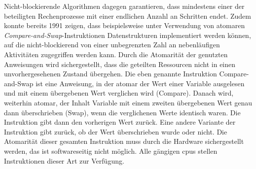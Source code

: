 Nicht-blockierende Algorithmen dagegen garantieren, dass mindestens einer der beteiligten Rechenprozesse mit einer endlichen Anzahl an Schritten endet. Zudem konnte \textcite{Herlihy1991} bereits 1991 zeigen, dass beispielsweise unter Verwendung von atomaren \emph{Compare-and-Swap}-Instruktionen Datenstrukturen implementiert werden können, auf die nicht-blockierend von einer unbegrenzten Zahl an nebenläufigen Aktivitäten zugegriffen werden kann. Durch die Atomarität der genutzten Anweisungen wird sichergestellt, dass die geteilten Ressourcen nicht in einen unvorhergesehenen Zustand übergehen. Die eben genannte Instruktion Compare-and-Swap ist eine Anweisung, in der atomar der Wert einer Variable ausgelesen und mit einem übergebenen Wert verglichen wird (Compare). Danach wird, weiterhin atomar, der Inhalt Variable mit einem zweiten übergebenen Wert genau dann überschrieben (Swap), wenn die verglichenen Werte identisch waren. Die Instruktion gibt dann den vorherigen Wert zurück. Eine andere Variante der Instruktion gibt zurück, ob der Wert überschrieben wurde oder nicht. Die Atomarität dieser gesamten Instruktion muss durch die Hardware sichergestellt werden, das ist softwareseitig nicht möglich. Alle gängigen \acp{cpu} stellen Instruktionen dieser Art zur Verfügung.
